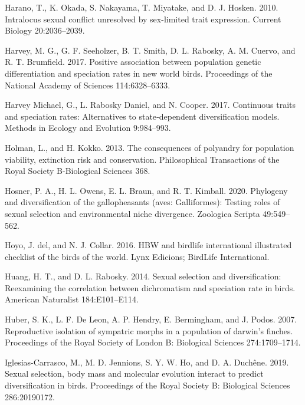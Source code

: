\documentclass[]{article}
\begin{document}
\leavevmode\hypertarget{ref-harano2010intralocus}{}%
Harano, T., K. Okada, S. Nakayama, T. Miyatake, and D. J. Hosken. 2010.
Intralocus sexual conflict unresolved by sex-limited trait expression.
Current Biology 20:2036--2039.

\leavevmode\hypertarget{ref-Harvey_2017}{}%
Harvey, M. G., G. F. Seeholzer, B. T. Smith, D. L. Rabosky, A. M.
Cuervo, and R. T. Brumfield. 2017. Positive association between
population genetic differentiation and speciation rates in new world
birds. Proceedings of the National Academy of Sciences 114:6328--6333.

\leavevmode\hypertarget{ref-Harvey_essim_2017}{}%
Harvey Michael, G., L. Rabosky Daniel, and N. Cooper. 2017. Continuous
traits and speciation rates: Alternatives to state‐dependent
diversification models. Methods in Ecology and Evolution 9:984--993.

\leavevmode\hypertarget{ref-Holman_Kokko_2013}{}%
Holman, L., and H. Kokko. 2013. The consequences of polyandry for
population viability, extinction risk and conservation. Philosophical
Transactions of the Royal Society B-Biological Sciences 368.

\leavevmode\hypertarget{ref-Hosner_2020}{}%
Hosner, P. A., H. L. Owens, E. L. Braun, and R. T. Kimball. 2020.
Phylogeny and diversification of the gallopheasants (aves: Galliformes):
Testing roles of sexual selection and environmental niche divergence.
Zoologica Scripta 49:549--562.

\leavevmode\hypertarget{ref-delhoyo_2016}{}%
Hoyo, J. del, and N. J. Collar. 2016. HBW and birdlife international
illustrated checklist of the birds of the world. Lynx Edicions; BirdLife
International.

\leavevmode\hypertarget{ref-Huang_2014}{}%
Huang, H. T., and D. L. Rabosky. 2014. Sexual selection and
diversification: Reexamining the correlation between dichromatism and
speciation rate in birds. American Naturalist 184:E101--E114.

\leavevmode\hypertarget{ref-Huber_2007}{}%
Huber, S. K., L. F. De Leon, A. P. Hendry, E. Bermingham, and J. Podos.
2007. Reproductive isolation of sympatric morphs in a population of
darwin's finches. Proceedings of the Royal Society of London B:
Biological Sciences 274:1709--1714.

\leavevmode\hypertarget{ref-Iglesias-Carrasco_2019}{}%
Iglesias-Carrasco, M., M. D. Jennions, S. Y. W. Ho, and D. A. Duchêne.
2019. Sexual selection, body mass and molecular evolution interact to
predict diversification in birds. Proceedings of the Royal Society B:
Biological Sciences 286:20190172.
\end{document}
